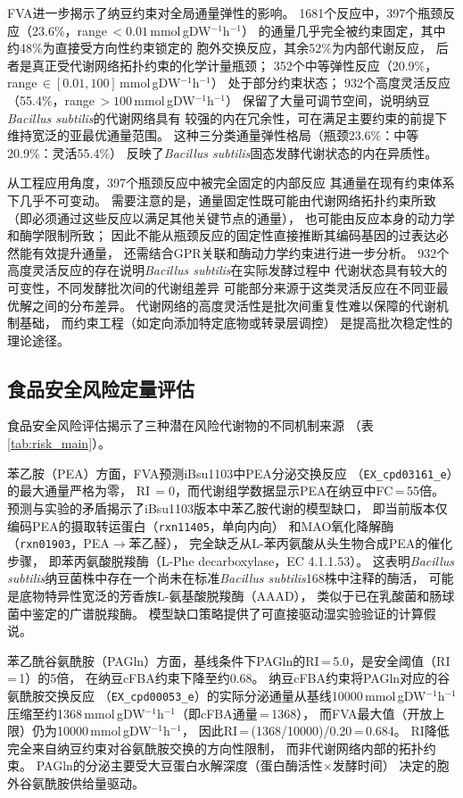 \documentclass[10pt, a4paper, twocolumn]{ctexart}
\newcommand{\ibsu}{iBsu1103}
\newcommand{\bs}{\textit{Bacillus subtilis}}
\newcommand{\cfba}{cFBA}
\newcommand{\mmolg}{mmol\,gDW$^{-1}$h$^{-1}$}
\begin{document}
FVA进一步揭示了纳豆约束对全局通量弹性的影响。
1681个反应中，397个瓶颈反应（23.6\%，range\,$<0.01$\,\mmolg{}）
的通量几乎完全被约束固定，其中约48\%为直接受方向性约束锁定的
胞外交换反应，其余52\%为内部代谢反应，
后者是真正受代谢网络拓扑约束的化学计量瓶颈；
352个中等弹性反应（20.9\%，range\,$\in[0.01,100]$\,\mmolg{}）
处于部分约束状态；
932个高度灵活反应（55.4\%，range\,$>100$\,\mmolg{}）
保留了大量可调节空间，说明纳豆\bs{}的代谢网络具有
较强的内在冗余性，可在满足主要约束的前提下
维持宽泛的亚最优通量范围。
这种三分类通量弹性格局（瓶颈23.6\%：中等20.9\%：灵活55.4\%）
反映了\bs{}固态发酵代谢状态的内在异质性。

从工程应用角度，397个瓶颈反应中被完全固定的内部反应
其通量在现有约束体系下几乎不可变动。
需要注意的是，通量固定性既可能由代谢网络拓扑约束所致（即必须通过这些反应以满足其他关键节点的通量），
也可能由反应本身的动力学和酶学限制所致；
因此不能从瓶颈反应的固定性直接推断其编码基因的过表达必然能有效提升通量，
还需结合GPR关联和酶动力学约束进行进一步分析。
932个高度灵活反应的存在说明\bs{}在实际发酵过程中
代谢状态具有较大的可变性，不同发酵批次间的代谢组差异
可能部分来源于这类灵活反应在不同亚最优解之间的分布差异。
代谢网络的高度灵活性是批次间重复性难以保障的代谢机制基础，
而约束工程（如定向添加特定底物或转录层调控）
是提高批次稳定性的理论途径。



\subsection{食品安全风险定量评估}

食品安全风险评估揭示了三种潜在风险代谢物的不同机制来源
（表\ref{tab:risk_main}）。

苯乙胺（PEA）方面，FVA预测\ibsu{}中PEA分泌交换反应
（\texttt{EX\_cpd03161\_e}）的最大通量严格为零，
RI\,$=0$，而代谢组学数据显示PEA在纳豆中FC\,=\,55倍。
预测与实验的矛盾揭示了\ibsu{}版本中苯乙胺代谢的模型缺口，
即当前版本仅编码PEA的摄取转运蛋白（\texttt{rxn11405}，单向内向）
和MAO氧化降解酶（\texttt{rxn01903}，PEA$\to$苯乙醛），
完全缺乏从L-苯丙氨酸从头生物合成PEA的催化步骤，
即苯丙氨酸脱羧酶（L-Phe decarboxylase，EC 4.1.1.53）。
这表明\bs{}纳豆菌株中存在一个尚未在标准\bs{}168株中注释的酶活，
可能是底物特异性宽泛的芳香族L-氨基酸脱羧酶（AAAD），
类似于已在乳酸菌和肠球菌中鉴定的广谱脱羧酶\citep{Ladero2010}。
模型缺口策略提供了可直接驱动湿实验验证的计算假说。

苯乙酰谷氨酰胺（PAGln）方面，基线条件下PAGln的RI\,=\,5.0，是安全阈值（RI\,=\,1）的5倍，
在纳豆\cfba{}约束下降至约0.68。
纳豆\cfba{}约束将PAGln对应的谷氨酰胺交换反应
（\texttt{EX\_cpd00053\_e}）的实际分泌通量从基线10000\,\mmolg{}
压缩至约1368\,\mmolg{}（即cFBA通量\,=\,1368），
而FVA最大值（开放上限）仍为10000\,\mmolg{}，
因此RI\,=\,(1368/10000)/0.20\,=\,0.684。
RI降低完全来自纳豆约束对谷氨酰胺交换的方向性限制，
而非代谢网络内部的拓扑约束。
PAGln的分泌主要受大豆蛋白水解深度（蛋白酶活性$\times$发酵时间）
决定的胞外谷氨酰胺供给量驱动。
\end{document}
